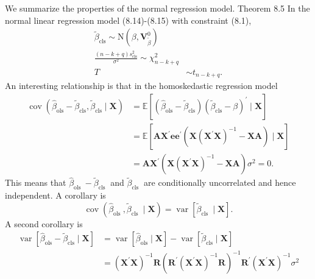 \documentclass[10pt]{article}
\begin{document}
We summarize the properties of the normal regression model. Theorem 8.5 In the normal linear regression model (8.14)-(8.15) with constraint (8.1),
$$
\begin{aligned}
\widetilde{\beta}_{\mathrm{cls}} \sim \mathrm{N}\left(\beta, \boldsymbol{V}_{\widetilde{\beta}}^{0}\right) \\
\frac{(n-k+q) s_{\mathrm{cls}}^{2}}{\sigma^{2}} \sim \chi_{n-k+q}^{2} \\
T & \sim t_{n-k+q} .
\end{aligned}
$$
An interesting relationship is that in the homoskedastic regression model
$$
\begin{aligned}
\operatorname{cov}\left(\widehat{\beta}_{\mathrm{ols}}-\widetilde{\beta}_{\mathrm{cls}}, \widetilde{\beta}_{\mathrm{cls}} \mid \boldsymbol{X}\right) &=\mathbb{E}\left[\left(\widehat{\beta}_{\mathrm{ols}}-\widetilde{\beta}_{\mathrm{cls}}\right)\left(\widetilde{\beta}_{\mathrm{cls}}-\beta\right)^{\prime} \mid \boldsymbol{X}\right] \\
&=\mathbb{E}\left[\boldsymbol{A} \boldsymbol{X}^{\prime} \boldsymbol{e} \boldsymbol{e}^{\prime}\left(\boldsymbol{X}\left(\boldsymbol{X}^{\prime} \boldsymbol{X}\right)^{-1}-\boldsymbol{X} \boldsymbol{A}\right) \mid \boldsymbol{X}\right] \\
&=\boldsymbol{A} \boldsymbol{X}^{\prime}\left(\boldsymbol{X}\left(\boldsymbol{X}^{\prime} \boldsymbol{X}\right)^{-1}-\boldsymbol{X} \boldsymbol{A}\right) \sigma^{2}=0 .
\end{aligned}
$$
This means that $\widehat{\beta}_{\text {ols }}-\widetilde{\beta}_{\text {cls }}$ and $\widetilde{\beta}_{\text {cls }}$ are conditionally uncorrelated and hence independent. A corollary is
$$
\operatorname{cov}\left(\widehat{\beta}_{\text {ols }}, \widetilde{\beta}_{\text {cls }} \mid \boldsymbol{X}\right)=\operatorname{var}\left[\widetilde{\beta}_{\text {cls }} \mid \boldsymbol{X}\right] .
$$
A second corollary is
$$
\begin{aligned}
\operatorname{var}\left[\widehat{\beta}_{\mathrm{ols}}-\widetilde{\beta}_{\mathrm{cls}} \mid \boldsymbol{X}\right] &=\operatorname{var}\left[\widehat{\beta}_{\mathrm{ols}} \mid \boldsymbol{X}\right]-\operatorname{var}\left[\widetilde{\beta}_{\mathrm{cls}} \mid \boldsymbol{X}\right] \\
&=\left(\boldsymbol{X}^{\prime} \boldsymbol{X}\right)^{-1} \boldsymbol{R}\left(\boldsymbol{R}^{\prime}\left(\boldsymbol{X}^{\prime} \boldsymbol{X}\right)^{-1} \boldsymbol{R}\right)^{-1} \boldsymbol{R}^{\prime}\left(\boldsymbol{X}^{\prime} \boldsymbol{X}\right)^{-1} \sigma^{2}
\end{aligned}
$$
\end{document}
